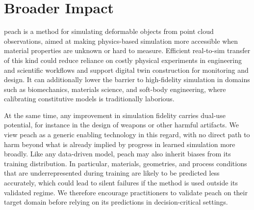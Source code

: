 \section{Broader Impact}
\label{app:broader_impact}
\gls{peach} is a method for simulating deformable objects from point cloud observations, aimed at making physics-based simulation more accessible when material properties are unknown or hard to measure.
Efficient real-to-sim transfer of this kind could reduce reliance on costly physical experiments in engineering and scientific workflows and support digital twin construction for monitoring and design.
It can additionally lower the barrier to high-fidelity simulation in domains such as biomechanics, materials science, and soft-body engineering, where calibrating constitutive models is traditionally laborious.

At the same time, any improvement in simulation fidelity carries dual-use potential, for instance in the design of weapons or other harmful artifacts. We view \gls{peach} as a generic enabling technology in this regard, with no direct path to harm beyond what is already implied by progress in learned simulation more broadly. 
Like any data-driven model, \gls{peach} may also inherit biases from its training distribution. In particular, materials, geometries, and process conditions that are underrepresented during training are likely to be predicted less accurately, which could lead to silent failures if the method is used outside its validated regime. 
We therefore encourage practitioners to validate \gls{peach} on their target domain before relying on its predictions in decision-critical settings.